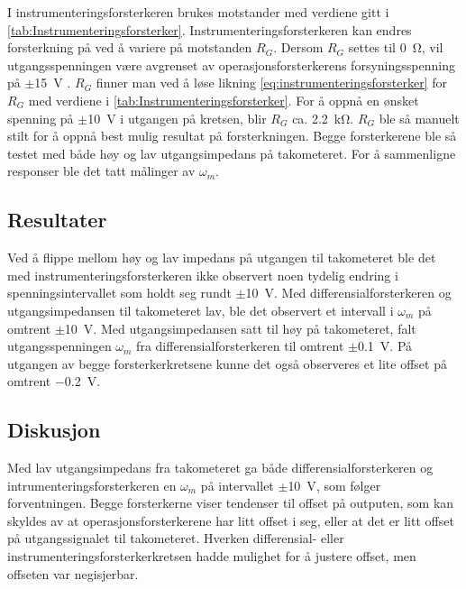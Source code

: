 I instrumenteringsforsterkeren brukes motstander med verdiene gitt i \autoref{tab:Instrumenteringsforsterker}. Instrumenteringsforsterkeren kan endres forsterkning på ved å variere på motstanden $R_G$. 
Dersom $R_G$ settes til {\SI{0}{\ohm}}, vil utgangsspenningen være avgrenset av operasjonsforsterkerens forsyningsspenning på $\pm${\SI{15}{\volt}} . 
$R_G$ finner man ved å løse likning \eqref{eq:instrumenteringsforsterker} for $R_G$ med verdiene i \autoref{tab:Instrumenteringsforsterker}. For å oppnå en ønsket spenning på $\pm${\SI{10}{\volt}} i utgangen på kretsen, blir $R_G$ ca. {\SI{2.2}{\kilo\ohm}}. $R_G$ ble så manuelt stilt for å oppnå best mulig resultat på forsterkningen. Begge forsterkerene ble så testet med både høy og lav utgangsimpedans på takometeret. For å sammenligne responser ble det tatt målinger av $\omega_m$.







\subsection{Resultater}

Ved å flippe mellom høy og lav impedans på utgangen til takometeret ble det med instrumenteringsforsterkeren ikke observert noen tydelig endring i spenningsintervallet som holdt seg rundt $\pm${\SI{10}{\volt}}. 
Med differensialforsterkeren og utgangsimpedansen til takometeret lav, ble det observert et intervall i $\omega_m$ på omtrent $\pm${\SI{10}{\volt}}. Med utgangsimpedansen satt til høy på takometeret, falt utgangsspenningen $\omega_m$ fra differensialforsterkeren til omtrent $\pm${\SI{0.1}{\volt}}.
På utgangen av begge forsterkerkretsene kunne det også observeres et lite offset på omtrent $-${\SI{0.2}{\volt}}.






\subsection{Diskusjon}

Med lav utgangsimpedans fra takometeret ga både differensialforsterkeren og intrumenteringsforsterkeren en $\omega_m$ på intervallet $\pm${\SI{10}{\volt}}, som følger forventningen.
Begge forsterkerne viser tendenser til offset på outputen, som kan skyldes av at operasjonsforsterkerene har litt offset i seg, eller at det er litt offset på utgangssignalet til takometeret. 
Hverken differensial- eller instrumenteringsforsterkerkretsen hadde mulighet for å justere offset, men offseten var negisjerbar.


